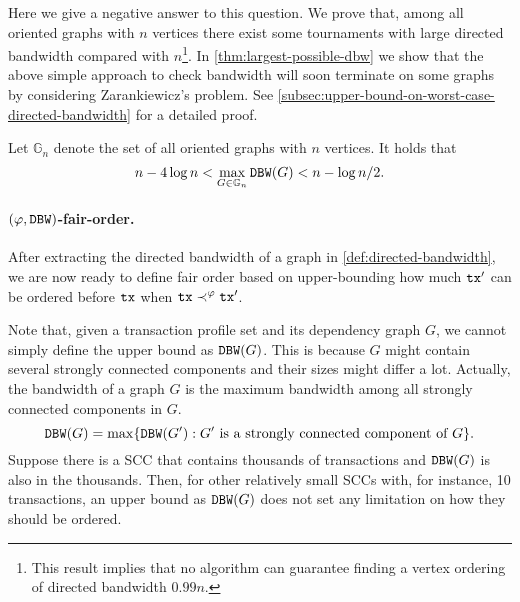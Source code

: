 Here we give a negative answer to this question.
%
We prove that, among all oriented graphs with $n$ vertices there exist some tournaments with large directed bandwidth compared with $n$\footnote{This result implies that no algorithm can guarantee finding a vertex ordering of directed bandwidth $0.99n$.}.
%
In \cref{thm:largest-possible-dbw} we show that the above simple approach to check bandwidth will soon terminate on some graphs by considering Zarankiewicz's problem.
%
See \cref{subsec:upper-bound-on-worst-case-directed-bandwidth} for a detailed proof.

\begin{theorem} \label{thm:largest-possible-dbw}
    Let $\mathbb{G}_n$ denote the set of all oriented graphs with $n$ vertices.
    It holds that
    \[ n - 4\log n < \max_{G \in \mathbb{G}_n} \mathtt{DBW}(G) < n - \log n / 2.\]
\end{theorem}

\paragraph{$(\varphi, \mathtt{DBW})$-fair-order.}
%
After extracting the directed bandwidth of a graph in \cref{def:directed-bandwidth}, we are now ready to define fair order based on upper-bounding how much $\mathtt{tx}'$ can be ordered before $\mathtt{tx}$ when $\mathtt{tx} \prec^\varphi \mathtt{tx}'$.

Note that, given a transaction profile set \profileSet and its dependency graph $G$, we cannot simply define the upper bound as $\mathtt{DBW}(G)$.
%
This is because $G$ might contain several strongly connected components and their sizes might differ a lot.
%
Actually, the bandwidth of a graph $G$ is the maximum bandwidth among all strongly connected components in $G$.
%
\[  \mathtt{DBW}(G) = \max \{ \mathtt{DBW}(G') : G' \text{ is a strongly connected component of } G \}. \]
%
Suppose there is a SCC that contains thousands of transactions and $\mathtt{DBW}(G)$ is also in the thousands.
%
Then, for other relatively small SCCs with, for instance, 10 transactions, an upper bound as $\mathtt{DBW}(G)$ does not set any limitation on how they should be ordered.

